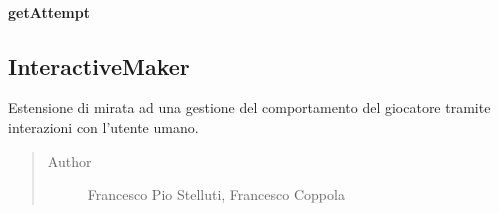 \documentclass[letterpaper,10pt,italian]{sphinxmanual}
\begin{document}
\paragraph{getAttempt}
\label{\detokenize{source/it/unicam/cs/pa/mastermind/players/InteractiveBreaker:getattempt}}

\begin{fulllineitems}
\label{\detokenize{source/it/unicam/cs/pa/mastermind/players/InteractiveBreaker:it.unicam.cs.pa.mastermind.players.InteractiveBreaker.getAttempt(InteractionView)}}
\end{fulllineitems}



\subsection{InteractiveMaker}
\label{\detokenize{source/it/unicam/cs/pa/mastermind/players/InteractiveMaker:interactivemaker}}\label{\detokenize{source/it/unicam/cs/pa/mastermind/players/InteractiveMaker::doc}}

\begin{fulllineitems}
\label{\detokenize{source/it/unicam/cs/pa/mastermind/players/InteractiveMaker:it.unicam.cs.pa.mastermind.players.InteractiveMaker}}
Estensione di  mirata ad una gestione del comportamento del giocatore tramite interazioni con l’utente umano.
\begin{quote}\begin{description}
\item[{Author}] \leavevmode
Francesco Pio Stelluti, Francesco Coppola

\end{description}\end{quote}

\end{fulllineitems}
\end{document}

